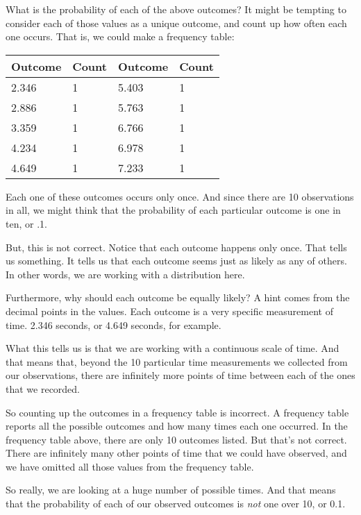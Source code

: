 \documentclass[../../../main.tex]{subfiles}
\begin{document}
What is the probability of each of the above outcomes? It might be tempting to consider each of those values as a unique outcome, and count up how often each one occurs. That is, we could make a frequency table:

\begin{center}
  \begin{tabular}{|| l | l || l | l |}
    \hline
    \textbf{Outcome} & \textbf{Count} & \textbf{Outcome} & \textbf{Count}  \\ \hline
    2.346 & 1 & 5.403 & 1 \\ \hline
    2.886 & 1 & 5.763 & 1 \\ \hline
    3.359 & 1 & 6.766 & 1 \\ \hline
    4.234 & 1 & 6.978 & 1 \\ \hline
    4.649 & 1 & 7.233 & 1 \\ \hline
  \end{tabular}
\end{center}

Each one of these outcomes occurs only once. And since there are 10 observations in all, we might think that the probability of each particular outcome is one in ten, or .1.

But, this is not correct. Notice that each outcome happens only once. That tells us something. It tells us that each outcome seems just as likely as any of others. In other words, we are working with a  distribution here.

Furthermore, why should each outcome be equally likely? A hint comes from the decimal points in the values. Each outcome is a very specific measurement of time. 2.346 seconds, or 4.649 seconds, for example. 

What this tells us is that we are working with a continuous scale of time. And that means that, beyond the 10 particular time measurements we collected from our observations, there are infinitely more points of time between each of the ones that we recorded.

So counting up the outcomes in a frequency table is incorrect. A frequency table reports all the possible outcomes and how many times each one occurred. In the frequency table above, there are only 10 outcomes listed. But that's not correct. There are infinitely many other points of time that we could have observed, and we have omitted all those values from the frequency table.

So really, we are looking at a huge number of possible times. And that means that the probability of each of our observed outcomes is \emph{not} one over 10, or 0.1.
\end{document}

